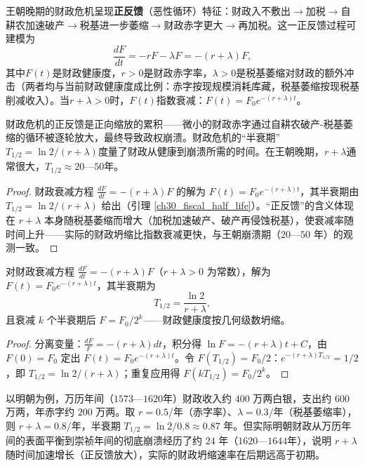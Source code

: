 \begin{proposition}[财政危机的正反馈放大]\label{prop:fiscal_crisis_feedback}
王朝晚期的财政危机呈现\textbf{正反馈}（恶性循环）特征：财政入不敷出$\to$加税$\to$自耕农加速破产$\to$税基进一步萎缩$\to$财政赤字更大$\to$再加税。这一正反馈过程可建模为
\[
\frac{dF}{dt} = -rF - \lambda F = -(r+\lambda)F,
\]
其中$F(t)$是财政健康度，$r > 0$是财政赤字率，$\lambda > 0$是税基萎缩对财政的额外冲击（两者均与当前财政健康度成比例：赤字按现规模消耗库藏，税基萎缩按现税基削减收入）。当$r + \lambda > 0$时，$F(t)$指数衰减：$F(t) = F_0 e^{-(r+\lambda)t}$。

财政危机的正反馈是正向缩放的累积——微小的财政赤字通过自耕农破产-税基萎缩的循环被逐轮放大，最终导致政权崩溃。财政危机的“半衰期”$T_{1/2} = \ln 2/(r+\lambda)$度量了财政从健康到崩溃所需的时间。在王朝晚期，$r+\lambda$通常很大，$T_{1/2} \approx 20$—$50$年。
\end{proposition}

\begin{proof}
财政衰减方程 $\frac{dF}{dt} = -(r+\lambda)F$ 的解为 $F(t) = F_0 e^{-(r+\lambda)t}$，其半衰期由 $T_{1/2} = \ln 2/(r+\lambda)$ 给出（引理 \ref{ch30_fiscal_half_life}）。“正反馈”的含义体现在 $r+\lambda$ 本身随税基萎缩而增大（加税加速破产、破产再侵蚀税基），使衰减率随时间上升——实际的财政坍缩比指数衰减更快，与王朝崩溃期（$20$—$50$ 年）的观测一致。
\end{proof}

\begin{lemma}[财政衰减的半衰期]\label{ch30_fiscal_half_life}
对财政衰减方程 $\frac{dF}{dt} = -(r+\lambda)F$（$r+\lambda > 0$ 为常数），解为 $F(t) = F_0 e^{-(r+\lambda)t}$，其半衰期为
\[
T_{1/2} = \frac{\ln 2}{r+\lambda},
\]
且衰减 $k$ 个半衰期后 $F = F_0 / 2^k$——财政健康度按几何级数坍缩。
\end{lemma}

\begin{proof}
分离变量：$\frac{dF}{F} = -(r+\lambda)dt$，积分得 $\ln F = -(r+\lambda)t + C$，由 $F(0) = F_0$ 定出 $F(t) = F_0 e^{-(r+\lambda)t}$。令 $F(T_{1/2}) = F_0/2$：$e^{-(r+\lambda)T_{1/2}} = 1/2$，即 $T_{1/2} = \ln 2/(r+\lambda)$；重复应用得 $F(kT_{1/2}) = F_0/2^k$。
\end{proof}

\begin{example}[明朝财政崩溃的数值分析]\label{ex:ming_fiscal_collapse}
以明朝为例，万历年间（$1573$—$1620$年）财政收入约 $400$ 万两白银，支出约 $600$ 万两，年赤字约 $200$ 万两。取 $r=0.5$/年（赤字率）、$\lambda=0.3$/年（税基萎缩率），则 $r+\lambda=0.8$/年，半衰期 $T_{1/2}=\ln2/0.8\approx0.87$ 年。但实际明朝财政从万历年间的表面平衡到崇祯年间的彻底崩溃经历了约 $24$ 年（$1620$—$1644$年），说明 $r+\lambda$ 随时间加速增长（正反馈放大），实际的财政坍缩速率在后期远高于初期。
\end{example}

